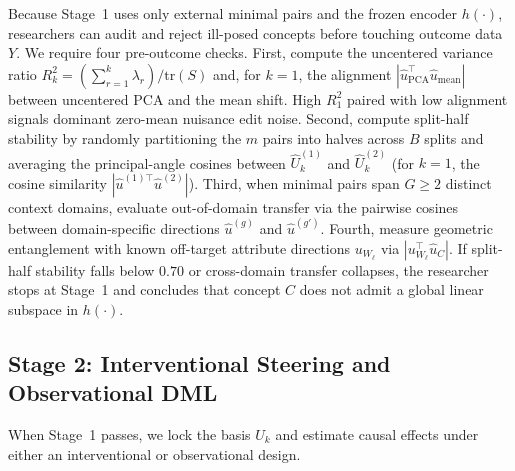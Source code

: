 \documentclass[11pt]{article}
\begin{document}
Because Stage~1 uses only external minimal pairs and the frozen encoder $h(\cdot)$, researchers can audit and reject ill-posed concepts before touching outcome data $Y$. We require four pre-outcome checks. First, compute the uncentered variance ratio $R_k^2 = (\sum_{r=1}^k \lambda_r)/\mathrm{tr}(S)$ and, for $k = 1$, the alignment $|\hat{u}_{\mathrm{PCA}}^\top \hat{u}_{\mathrm{mean}}|$ between uncentered PCA and the mean shift. High $R_1^2$ paired with low alignment signals dominant zero-mean nuisance edit noise. Second, compute split-half stability by randomly partitioning the $m$ pairs into halves across $B$ splits and averaging the principal-angle cosines between $\hat{U}_k^{(1)}$ and $\hat{U}_k^{(2)}$ (for $k = 1$, the cosine similarity $|\hat{u}^{(1)\top}\hat{u}^{(2)}|$). Third, when minimal pairs span $G \ge 2$ distinct context domains, evaluate out-of-domain transfer via the pairwise cosines between domain-specific directions $\hat{u}^{(g)}$ and $\hat{u}^{(g')}$. Fourth, measure geometric entanglement with known off-target attribute directions $u_{W_\ell}$ via $|u_{W_\ell}^\top \hat{u}_C|$. If split-half stability falls below $0.70$ or cross-domain transfer collapses, the researcher stops at Stage~1 and concludes that concept $C$ does not admit a global linear subspace in $h(\cdot)$.

\subsection{Stage 2: Interventional Steering and Observational DML}

When Stage~1 passes, we lock the basis $U_k$ and estimate causal effects under either an interventional or observational design.
\end{document}
